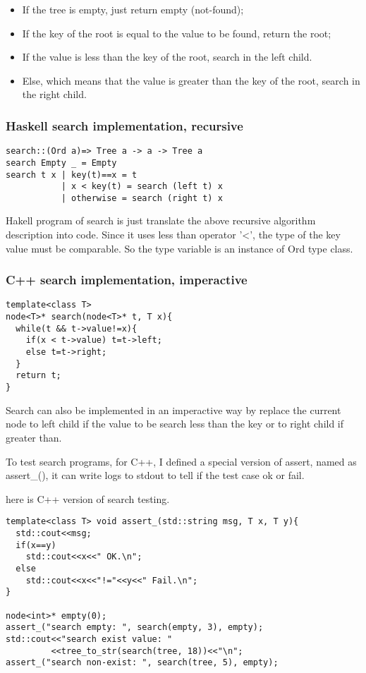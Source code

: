 \documentclass{article}
\begin{document}
\begin{itemize}
\item If the tree is empty, just return empty (not-found);
\item If the key of the root is equal to the value to be found, 
return the root;
\item If the value is less than the key of the root, search in the left
child.
\item Else, which means that the value is greater than the key of the 
root, search in the right child.
\end{itemize}

\subsubsection*{Haskell search implementation, recursive}
\lstset{language=Haskell}
\begin{lstlisting}
search::(Ord a)=> Tree a -> a -> Tree a
search Empty _ = Empty
search t x | key(t)==x = t
           | x < key(t) = search (left t) x
           | otherwise = search (right t) x
\end{lstlisting}

Hakell program of search is just translate the above recursive algorithm
description into code. Since it uses less than operator '<', the type
of the key value must be comparable. So the type variable is an instance 
of Ord type class.

\subsubsection*{C++ search implementation, imperactive}
\lstset{language=C++}
\begin{lstlisting}
template<class T>
node<T>* search(node<T>* t, T x){
  while(t && t->value!=x){
    if(x < t->value) t=t->left;
    else t=t->right;
  }
  return t;
}
\end{lstlisting}

Search can also be implemented in an imperactive way by replace the current
node to left child if the value to be search less than the key or to right 
child if greater than.

To test search programs, for C++, I defined a special version of assert, named
as assert\_(), it can write logs to stdout to tell if the test case ok or fail.

here is C++ version of search testing.

\lstset{language=c++}
\begin{lstlisting}
template<class T> void assert_(std::string msg, T x, T y){
  std::cout<<msg;
  if(x==y)
    std::cout<<x<<" OK.\n";
  else
    std::cout<<x<<"!="<<y<<" Fail.\n";
}

node<int>* empty(0);
assert_("search empty: ", search(empty, 3), empty);
std::cout<<"search exist value: "
         <<tree_to_str(search(tree, 18))<<"\n";
assert_("search non-exist: ", search(tree, 5), empty);
\end{lstlisting}
\end{document}
